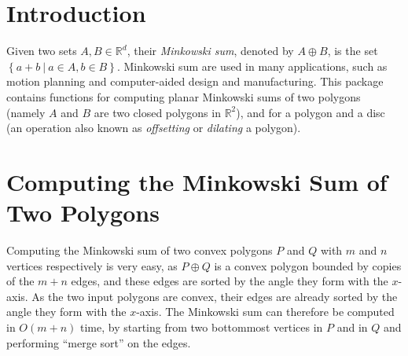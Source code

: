 \lcTex{%
  \newlength{\widthExtra}\setlength{\widthExtra}{1.1cm}
  \newlength{\widthLineReal}\setlength{\widthLineReal}{\linewidth}
  \addtolength{\widthLineReal}{-\widthExtra}
  \newlength{\minipageSpace}\setlength{\minipageSpace}{0.2cm}

  \newlength{\widthLeft}
  \newlength{\widthRight}
}

\newcommand{\reals}{\mathbb{R}}
\newcommand{\calC}{{\cal C}}
\newcommand{\calA}{{\cal A}}
\newcommand{\eps}{{\varepsilon}}
\newcommand{\dcel}{{\sc Dcel}}
\newcommand{\naive}{na\"{\i}ve}
\newcommand{\kdtree}{{\sc Kd}-tree}
\newcommand{\Cpp}{{C}{\tt ++}}

\section{Introduction}
\label{mink_sec:intro}

Given two sets $A,B \in \reals^d$, their \emph{Minkowski sum},
denoted by $A \oplus B$, is the set $\left\{ a + b ~|~ a \in
A, b \in B \right\}$. Minkowski sum are used in many applications,
such as motion planning and computer-aided design and
manufacturing. This package contains functions for computing planar
Minkowski sums of two polygons (namely $A$ and $B$ are two closed
polygons in $\reals^2$), and for a polygon and a disc (an operation
also known as \emph{offsetting} or \emph{dilating} a polygon).

\section{Computing the Minkowski Sum of Two Polygons}
\label{mink_sec:sum_poly}

Computing the Minkowski sum of two convex polygons $P$ and $Q$ with
$m$ and $n$ vertices respectively is very easy, as $P \oplus Q$ is a
convex polygon bounded by copies of the $m + n$ edges, and these edges
are sorted by the angle they form with the $x$-axis. As the two
input polygons are convex, their edges are already sorted by the
angle they form with the $x$-axis. The Minkowski sum can therefore be
computed in $O(m + n)$ time, by starting from two bottommost vertices
in $P$ and in $Q$ and performing ``merge sort'' on the edges.

